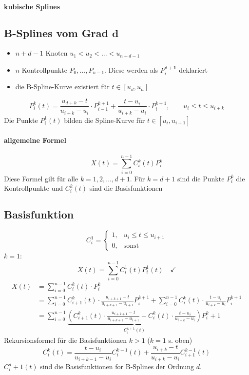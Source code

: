 \paragraph*{kubische Splines}
\begin{center}
\end{center}

\subsection{B-Splines vom Grad $\boldsymbol{d}$}
\begin{itemize}
 \item $n+d-1$ Knoten $u_1 < u_2 < ... < u_{n+d-1}$
 \item $n$ Kontrollpunkte $P_0, ..., P_{n-1}$. Diese werden als $P_i^{\boldsymbol{d+1}}$ deklariert
 \item die B-Spline-Kurve existiert für $t \in [u_d, u_n]$
	\begin{center}
	\end{center}
\end{itemize}
\[\boxed{P_i^k(t) = \frac{u_{d+k}-t}{u_{i+k}-u_i} \cdot P_{i-1}^{k+1} + \frac{t-u_i}{u_{i+k}-u_i} \cdot P_i^{k+1}},
	\qquad u_i \le t \le u_{i+k}\]
Die Punkte $P^1_i(t)$ bilden die Spline-Kurve für $t \in [u_i, u_{i+1}]$
\paragraph*{allgemeine Formel}
\[X(t) = \sum\limits_{i=0}^{n-1} C_i^k(t) P_i^k\]
Diese Formel gilt für alle $k = 1, 2, ..., d+1$. Für $k = d+1$ sind die Punkte $P_i^k$ die Kontrollpunkte und
$C_i^k(t)$ sind die Basisfunktionen

\subsection{Basisfunktion}
\begin{center}
\end{center}
\[\boxed{C_i^1 = \begin{cases}
           1, & u_i \le t \le u_{i+1}\\
           0, & \text{sonst}
          \end{cases}}
\]
$k = 1$:
\[X(t) = \sum\limits_{i=0}^{n-1} C^1_i(t) P^1_i(t) \quad \checkmark\]
\begin{align*}
 X(t) &= \sum\limits_{i=0}^{n-1} C_i^k(t) \cdot P_i^k\\
	&= \sum\limits_{i=0}^{n-1} C_{i+1}^k(t) \cdot \frac{u_{i+k+1} - t}{u_{i+k+1} - u_{i+1}} P_{i}^{k+1}
		+ \sum\limits_{i=0}^{n-1} C_{i}^k(t) \cdot \frac{t-u_{i}}{u_{i+k} - u_i} P_{i}^{k+1}\\
	&= \sum\limits_{i=0}^{n-1} \underbrace{\left(C_{i+1}^k(t) \cdot \frac{u_{i+k+1} - t}{u_{i+k+1} - u_{i+1}}
		+ C_{i}^k(t) \cdot \frac{t-u_{i}}{u_{i+k} - u_i} \right)}_{C_i^{k+1}(t)} P_i^k+1
\end{align*}
Rekursionsformel für die Basisfunktionen $k > 1$ ($k = 1$ s. oben)
\[\boxed{C_i^k(t) = \frac{t-u_{i}}{u_{i+k-1} - u_i} C_i^{k-1}(t) + \frac{u_{i+k}-t}{u_{i+k} - u_i} C_{i+1}^{k-1}(t)}\]
$C_i^d+1(t)$ sind die Basisfunktionen for B-Splines der Ordnung $d$.

